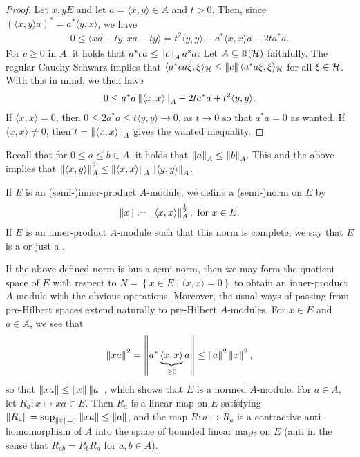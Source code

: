 \begin{proof}
Let $x,y E$ and let $a = \langle x,y \rangle \in A$ and $t >0$. Then, since $(\langle x,y \rangle a)^* = a^*\langle y,x\rangle$, we have
\begin{align*}
	0 \leq \langle xa-ty,xa-ty\rangle =t^2\langle y,y \rangle + a^* \langle x,x \rangle a-2ta^*a.
\end{align*}
For $c \geq 0 $ in $A$, it holds that $a^*c a \leq \left\lVert c \right\rVert_A a^*a$: Let $A \subseteq \mathbb{B}(\mathcal{H})$ faithfully. The regular Cauchy-Schwarz implies that $\langle a^*ca \xi,\xi\rangle_{\mathcal{H}} \leq \left\lVert c \right\rVert \langle a^*a \xi,\xi\rangle_{\mathcal{H}}$ for all $ \xi \in \mathcal{H}$. With this in mind, we then have
\begin{align*}
	0 \leq  a^*a \left\lVert \langle x , x \rangle \right\rVert_A -2t a^*a + t^2 \langle y, y \rangle.
\end{align*}
If $\langle x , x \rangle = 0$, then $0 \leq 2a^*a \leq t \langle y , y\rangle \to 0$, as $t \to 0$ so that $a^*a = 0$ as wanted. If $\langle x , x \rangle \neq 0$, then $t = \left\lVert \langle x,x\rangle\right\rVert_A$ gives the wanted inequality.
\end{proof}
Recall that for $0 \leq a \leq b \in A$, it holds that $\left\lVert a \right\rVert_A \leq \left\lVert b \right\rVert_A$. This and the above implies that $\left\lVert \langle x,y \rangle\right\rVert_A^2 \leq \left\lVert \langle x, x \rangle \right\rVert_A \left\lVert \langle y,y\rangle \right\rVert_A$. 
\begin{definition}
	If $E$ is an (semi-)inner-product $A$-module, we define a (semi-)norm on $E$ by
	\begin{align*}
		\left\lVert x \right\rVert := \left\lVert \langle x , x \rangle\right\rVert_A^{\frac12}, \text{ for } x \in E.
	\end{align*}
	If $E$ is an inner-product $A$-module such that this norm is complete, we say that $E$ is a  or just a .
\end{definition}
If the above defined norm is but a semi-norm, then we may form the quotient space of $E$ with respect to $N=\left\{ x \in E \mid \langle x , x \rangle = 0 \right\}$ to obtain an inner-product $A$-module with the obvious operations. Moreover, the usual ways of passing from pre-Hilbert spaces extend naturally to pre-Hilbert $A$-modules. For $x \in E$ and $a \in A$, we see that
\begin{align*}
	\left\lVert x a \right\rVert^2 = \left\lVert a^* \underbrace{\langle x, x \rangle}_{\geq 0} a \right\rVert \leq \left\lVert a \right\rVert^2 \left\lVert x \right\rVert^2,
\end{align*}
so that $\left\lVert x a \right\rVert \leq \left\lVert x \right\rVert \left\lVert a \right\rVert$, which shows that $E$ is a normed $A$-module. For $a \in A$, let $R_a \colon x \mapsto xa \in E$. Then $R_a$ is a linear map on $E$ satisfying $\left\lVert R_a\right\rVert = \sup_{\left\lVert x \right\rVert = 1} \left\lVert xa \right\rVert \leq \left\lVert a \right\rVert$, and the map $R \colon a \mapsto R_a$ is a contractive anti-homomorphism of $A$ into the space of bounded linear maps on $E$ (anti in the sense that $R_{ab}=R_bR_a$ for $a,b \in A$).




